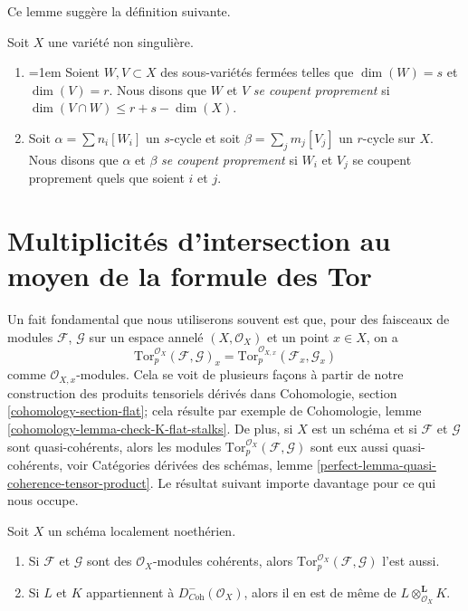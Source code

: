 \noindent
Ce lemme suggère la définition suivante.

\begin{definition}
\label{definition-proper-intersection}
Soit $X$ une variété non singulière.
\begin{enumerate}
\item {\emergencystretch=1em Soient $W,V \subset X$ des sous-variétés fermées telles que
$\dim(W) = s$ et $\dim(V) = r$. Nous disons que $W$ et $V$
{\it se coupent proprement} si $\dim(V \cap W) \leq r + s - \dim(X)$.\par}
\item Soit $\alpha = \sum n_i [W_i]$ un $s$-cycle et soit
$\beta = \sum_j m_j [V_j]$ un $r$-cycle sur $X$. Nous disons
que $\alpha$ et $\beta$ {\it se coupent proprement} si
$W_i$ et $V_j$ se coupent proprement quels que soient $i$ et $j$.
\end{enumerate}
\end{definition}


\section{Multiplicités d'intersection au moyen de la formule des Tor}
\label{section-tor-formula}

\noindent
Un fait fondamental que nous utiliserons souvent est que, pour des faisceaux de
modules $\mathcal{F}$, $\mathcal{G}$ sur un espace annelé $(X, \mathcal{O}_X)$
et un point $x \in X$, on a
$$
\text{Tor}_p^{\mathcal{O}_X}(\mathcal{F}, \mathcal{G})_x =
\text{Tor}_p^{\mathcal{O}_{X, x}}(\mathcal{F}_x, \mathcal{G}_x)
$$
comme $\mathcal{O}_{X, x}$-modules. Cela se voit de plusieurs façons
à partir de notre construction des produits tensoriels dérivés dans
Cohomologie, section \ref{cohomology-section-flat}; cela résulte par exemple de
Cohomologie, lemme \ref{cohomology-lemma-check-K-flat-stalks}.
De plus, si $X$ est un schéma et si $\mathcal{F}$ et $\mathcal{G}$
sont quasi-cohérents, alors les modules
$\text{Tor}_p^{\mathcal{O}_X}(\mathcal{F}, \mathcal{G})$ sont eux aussi
quasi-cohérents, voir
Catégories dérivées des schémas, lemme
\ref{perfect-lemma-quasi-coherence-tensor-product}.
Le résultat suivant importe davantage pour ce qui nous occupe.

\begin{lemma}
\label{lemma-tensor-coherent}
Soit $X$ un schéma localement noethérien.
\begin{enumerate}
\item Si $\mathcal{F}$ et $\mathcal{G}$ sont des $\mathcal{O}_X$-modules cohérents,
alors $\text{Tor}_p^{\mathcal{O}_X}(\mathcal{F}, \mathcal{G})$ l'est aussi.
\item Si $L$ et $K$ appartiennent à $D^-_{\textit{Coh}}(\mathcal{O}_X)$, alors
il en est de même de $L \otimes_{\mathcal{O}_X}^\mathbf{L} K$.
\end{enumerate}
\end{lemma}

